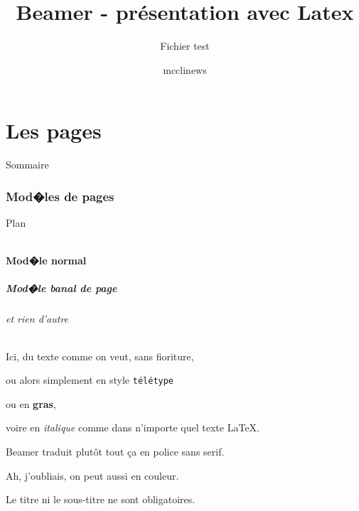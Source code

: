 \documentclass[slidetop,11pt]{beamer}
\title{Beamer - présentation avec Latex}
\subtitle{Fichier test}
\author{mcclinews}
\institute{Université de Barrayar}
\date{\oldstylenums{Octobre 2007}}
\begin{document}
\frame{\titlepage}
%
\part{Les pages} 
\begin{frame}{Sommaire}
  \small \tableofcontents[hideallsubsections]
\end{frame} 
%
\section[Mod�les]{Mod�les de pages}
\begin{frame}{Plan}
  \begin{columns}[t]
  \begin{column}{5cm}
  \tableofcontents[sections={1-4},currentsection, hideothersubsections]
  \end{column}
  \begin{column}{5cm}
  \tableofcontents[sections={5-8},currentsection,hideothersubsections]
  \end{column}
  \end{columns}
\end{frame}

\subsection[Normal]{Mod�le normal}
\begin{frame}[label=pagesimple]
  \frametitle{Mod�le banal de page}
  \framesubtitle{et rien d'autre}
  Ici, du texte comme on veut, sans fioriture, 
  
  ou alors simplement en style \texttt{télétype} 
  
  ou en \textbf{gras}, 
  
  voire en \textit{italique} comme dans n'importe quel texte \LaTeX{}. 
  
  Beamer traduit plutôt tout ça en police sans serif.
  
  Ah, j'oubliais, on peut aussi en {\color{blue}couleur}.
  
  \bigskip
  
  Le titre ni le sous-titre ne sont obligatoires.
\end{frame}
\end{document}
